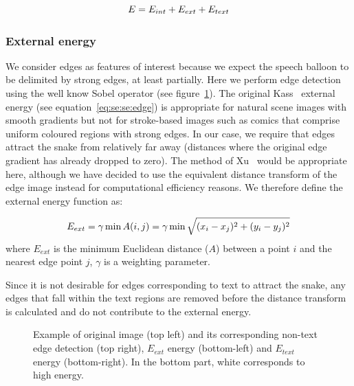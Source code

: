 \begin{equation}\label{eq:se:se:energy2}
  E = E_{int} + E_{ext} + E_{text}\\
\end{equation}

\subsubsection{External energy}
\label{sec:external_energie}

We consider edges as features of interest because we expect the speech balloon to be delimited by strong edges, at least partially.
Here we perform edge detection using the well know Sobel operator (see figure~\ref{fig:se:se:distance_transform}).
The original Kass~\cite{Kass1988} external energy (see equation~\ref{eq:se:se:edge}) is appropriate for natural scene images with smooth gradients but not for stroke-based images such as comics that comprise uniform coloured regions with strong edges.
In our case, we require that edges attract the snake from relatively far away (distances where the original edge gradient has already dropped to zero).
The method of Xu~\cite{Xu1998} would be appropriate here, although we have decided to use the equivalent distance transform of the edge image instead for computational efficiency reasons.
We therefore define the external energy function as:

\begin{equation}\label{eq:se:energy3}
  E_{ext} = \gamma \min A(i,j) = \gamma \min  \sqrt{(x_i-x_j)^2+(y_i-y_j)^2}\\
\end{equation}
where $E_{ext}$ is the minimum Euclidean distance ($A$) between a point $i$ and the nearest edge point $j$, $\gamma$ is a weighting parameter.

Since it is not desirable for edges corresponding to text to attract the snake, any edges that fall within the text regions are removed before the distance transform is calculated and do not contribute to the external energy.
	
	\begin{figure}[!ht]	%
	  \centering
		\caption{Example of original image (top left) and its corresponding non-text edge detection (top right), $E_{ext}$ energy (bottom-left) and $E_{text}$ energy (bottom-right). In the bottom part, white corresponds to high energy.}
		\label{fig:se:se:distance_transform}
	\end{figure}

